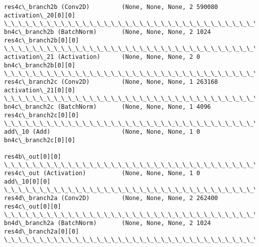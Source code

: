\documentclass[11pt]{article}
\begin{document}
\begin{Verbatim}[commandchars=\\\{\}]
res4c\_branch2b (Conv2D)         (None, None, None, 2 590080      activation\_20[0][0]              
\_\_\_\_\_\_\_\_\_\_\_\_\_\_\_\_\_\_\_\_\_\_\_\_\_\_\_\_\_\_\_\_\_\_\_\_\_\_\_\_\_\_\_\_\_\_\_\_\_\_\_\_\_\_\_\_\_\_\_\_\_\_\_\_\_\_\_\_\_\_\_\_\_\_\_\_\_\_\_\_\_\_\_\_\_\_\_\_\_\_\_\_\_\_\_\_\_\_
bn4c\_branch2b (BatchNorm)       (None, None, None, 2 1024        res4c\_branch2b[0][0]             
\_\_\_\_\_\_\_\_\_\_\_\_\_\_\_\_\_\_\_\_\_\_\_\_\_\_\_\_\_\_\_\_\_\_\_\_\_\_\_\_\_\_\_\_\_\_\_\_\_\_\_\_\_\_\_\_\_\_\_\_\_\_\_\_\_\_\_\_\_\_\_\_\_\_\_\_\_\_\_\_\_\_\_\_\_\_\_\_\_\_\_\_\_\_\_\_\_\_
activation\_21 (Activation)      (None, None, None, 2 0           bn4c\_branch2b[0][0]              
\_\_\_\_\_\_\_\_\_\_\_\_\_\_\_\_\_\_\_\_\_\_\_\_\_\_\_\_\_\_\_\_\_\_\_\_\_\_\_\_\_\_\_\_\_\_\_\_\_\_\_\_\_\_\_\_\_\_\_\_\_\_\_\_\_\_\_\_\_\_\_\_\_\_\_\_\_\_\_\_\_\_\_\_\_\_\_\_\_\_\_\_\_\_\_\_\_\_
res4c\_branch2c (Conv2D)         (None, None, None, 1 263168      activation\_21[0][0]              
\_\_\_\_\_\_\_\_\_\_\_\_\_\_\_\_\_\_\_\_\_\_\_\_\_\_\_\_\_\_\_\_\_\_\_\_\_\_\_\_\_\_\_\_\_\_\_\_\_\_\_\_\_\_\_\_\_\_\_\_\_\_\_\_\_\_\_\_\_\_\_\_\_\_\_\_\_\_\_\_\_\_\_\_\_\_\_\_\_\_\_\_\_\_\_\_\_\_
bn4c\_branch2c (BatchNorm)       (None, None, None, 1 4096        res4c\_branch2c[0][0]             
\_\_\_\_\_\_\_\_\_\_\_\_\_\_\_\_\_\_\_\_\_\_\_\_\_\_\_\_\_\_\_\_\_\_\_\_\_\_\_\_\_\_\_\_\_\_\_\_\_\_\_\_\_\_\_\_\_\_\_\_\_\_\_\_\_\_\_\_\_\_\_\_\_\_\_\_\_\_\_\_\_\_\_\_\_\_\_\_\_\_\_\_\_\_\_\_\_\_
add\_10 (Add)                    (None, None, None, 1 0           bn4c\_branch2c[0][0]              
                                                                 res4b\_out[0][0]                  
\_\_\_\_\_\_\_\_\_\_\_\_\_\_\_\_\_\_\_\_\_\_\_\_\_\_\_\_\_\_\_\_\_\_\_\_\_\_\_\_\_\_\_\_\_\_\_\_\_\_\_\_\_\_\_\_\_\_\_\_\_\_\_\_\_\_\_\_\_\_\_\_\_\_\_\_\_\_\_\_\_\_\_\_\_\_\_\_\_\_\_\_\_\_\_\_\_\_
res4c\_out (Activation)          (None, None, None, 1 0           add\_10[0][0]                     
\_\_\_\_\_\_\_\_\_\_\_\_\_\_\_\_\_\_\_\_\_\_\_\_\_\_\_\_\_\_\_\_\_\_\_\_\_\_\_\_\_\_\_\_\_\_\_\_\_\_\_\_\_\_\_\_\_\_\_\_\_\_\_\_\_\_\_\_\_\_\_\_\_\_\_\_\_\_\_\_\_\_\_\_\_\_\_\_\_\_\_\_\_\_\_\_\_\_
res4d\_branch2a (Conv2D)         (None, None, None, 2 262400      res4c\_out[0][0]                  
\_\_\_\_\_\_\_\_\_\_\_\_\_\_\_\_\_\_\_\_\_\_\_\_\_\_\_\_\_\_\_\_\_\_\_\_\_\_\_\_\_\_\_\_\_\_\_\_\_\_\_\_\_\_\_\_\_\_\_\_\_\_\_\_\_\_\_\_\_\_\_\_\_\_\_\_\_\_\_\_\_\_\_\_\_\_\_\_\_\_\_\_\_\_\_\_\_\_
bn4d\_branch2a (BatchNorm)       (None, None, None, 2 1024        res4d\_branch2a[0][0]             
\_\_\_\_\_\_\_\_\_\_\_\_\_\_\_\_\_\_\_\_\_\_\_\_\_\_\_\_\_\_\_\_\_\_\_\_\_\_\_\_\_\_\_\_\_\_\_\_\_\_\_\_\_\_\_\_\_\_\_\_\_\_\_\_\_\_\_\_\_\_\_\_\_\_\_\_\_\_\_\_\_\_\_\_\_\_\_\_\_\_\_\_\_\_\_\_\_\_

\end{Verbatim}
\end{document}
